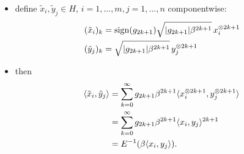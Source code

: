 	\begin{frame}
		\begin{pbmr}
			\begin{itemize}
				\item<1-> define $\tilde{x}_i, \tilde{y}_j\in H$, $i=1,\dots,m,j=1,\dots,n$ componentwise:
					\begin{align}
						(\tilde{x}_i)_k &= \operatorname{sign}(g_{2k+1}) \sqrt{{\left|{g_{2k+1}}\right|}\beta^{2k+1}}\, x_i^{\otimes 2k+1} \\
						(\tilde{y}_j)_k &= \sqrt{{\left|{g_{2k+1}}\right|}\beta^{2k+1}} \,y_j^{\otimes 2k+1}
					\end{align}
				\item<2-> then
					\begin{align*}
						\langle{\tilde{x}_i},{\tilde{y}_j}\rangle &= \sum_{k=0}^\infty g_{2k+1} \beta^{2k+1}\langle{x_i^{\ensuremath{\otimes}2k+1}},{y_j^{\otimes 2k+1}}\rangle \\
						&= \sum_{k=0}^\infty g_{2k+1} \beta^{2k+1} \langle{x_i},{y_j}\rangle^{2k+1} \\
						&= E^{-1}(\beta \langle{x_i},{y_j}\rangle).
					\end{align*}
			\end{itemize}
		\end{pbmr}
	\end{frame}
